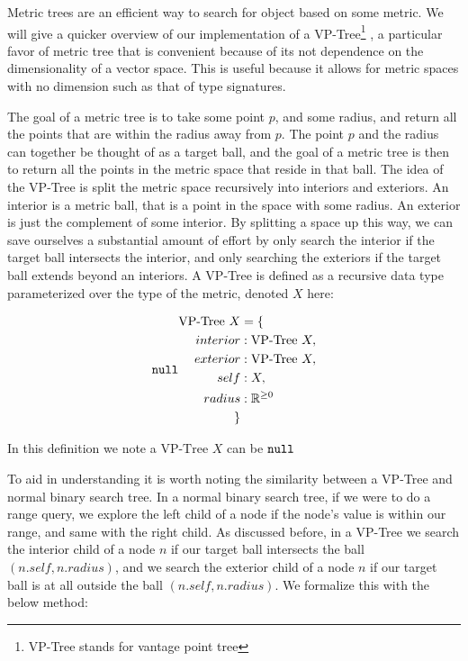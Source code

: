 Metric trees are an efficient way to search for object based on some metric.
We will give a quicker overview of our implementation of a VP-Tree\footnote{VP-Tree stands for vantage point tree} \cite{j2kun_2014},
a particular favor of metric tree that is convenient because of its not dependence on the dimensionality of a vector space.
This is useful because it allows for metric spaces with no dimension such as that of type signatures.

The goal of a metric tree is to take some point $p$, and some radius, and return all the points that are within the radius away from $p$.
The point $p$ and the radius can together be thought of as a target ball, and the goal of a metric tree is then to return all the points in the metric space 
    that reside in that ball.
The idea of the VP-Tree is split the metric space recursively into interiors and exteriors.
An interior is a metric ball, that is a point in the space with some radius.
An exterior is just the complement of some interior.
By splitting a space up this way, 
we can save ourselves a substantial amount of effort by only search the interior if the target ball intersects the interior,
and only searching the exteriors if the target ball extends beyond an interiors.
A VP-Tree is defined as a recursive data type parameterized over the type of the metric, denoted $X$ here:

\begin{align*}
\text{VP-Tree } X &= \{ \\ 
interior &: \text{VP-Tree } X, \\ 
exterior &: \text{VP-Tree } X, \\ 
self &: X, \\ 
radius &: \Rnn \\
\}
\end{align*}

In this definition we note a $\text{VP-Tree } X$ can be $\texttt{null}$

To aid in understanding it is worth noting the similarity between a VP-Tree and normal binary search tree.
In a normal binary search tree,
if we were to do a range query,
we explore the left child of a node if the node's value is within our range,
and same with the right child.
As discussed before,
in a VP-Tree we search the interior child of a node $n$ if our target ball intersects the ball $(n.self, n.radius)$,
and we search the exterior child of a node $n$ if our target ball is at all outside the ball $(n.self, n.radius)$.
We formalize this with the below method:

